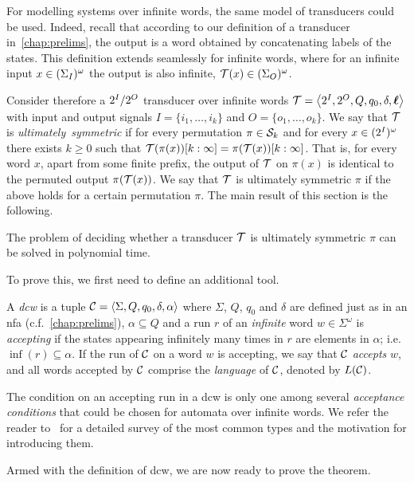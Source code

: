 For modelling systems over infinite words, the same model of transducers could be used. Indeed, recall that according to our definition of a transducer in~\cref{chap:prelims}, the output is a word obtained by concatenating labels of the states. This definition extends seamlessly for infinite words, where for an infinite input $x\in(\Sigma_{I})^\omega$ the output is also infinite, $\mathcal{T}(x)\in(\Sigma_{O})^\omega$.

Consider therefore a $2^{I}/2^{O}$ transducer over infinite words $\mathcal{T}=\left< 2^{I},2^{O},Q,q_0,\delta,\boldsymbol{\ell}\right>$ with input and output signals $I=\{i_1,\ldots,i_k\}$ and $O=\{o_1,\ldots,o_k\}$. We say that $\mathcal{T}$ is \emph{ultimately~symmetric} if for every permutation $\pi\in \mathcal{S}_k$ and for every $x\in (2^{I})^\omega$ there exists $k\ge 0$ such that $\mathcal{T}(\pi(x))[k:\infty] = \pi(\mathcal{T}(x))[k:\infty]$. That is, for every word $x$, apart from some finite prefix, the output of $\mathcal{T}$ on $\pi(x)$ is identical to the permuted output $\pi(\mathcal{T}(x))$. We say that $\mathcal{T}$ is ultimately symmetric \WRT $\pi$ if the above holds for a certain permutation $\pi$. The main result of this section is the following.

\begin{theorem}
    \label{thm:ultimate}
	The problem of deciding whether a transducer $\mathcal{T}$ is ultimately symmetric \WRT $\pi$ can be solved in polynomial time.
\end{theorem}
To prove this, we first need to define an additional tool.

A \emph{\gls{dcw}} is a tuple $\mathcal{C}=\left< \Sigma,Q,q_0,\delta,\alpha\right>$
where $\Sigma$, $Q$, $q_0$ and $\delta$ are defined just as in an \gls{nfa} (c.f.~\cref{chap:prelims}), $\alpha \subseteq Q$ and a run $r$ of an \emph{infinite} word $w\in\Sigma^\omega$ is \emph{accepting} if the states appearing infinitely many times in $r$ are elements in $\alpha$; i.e. $\inf(r) \subseteq \alpha$. If the run of $\mathcal{C}$ on a word $w$ is accepting, we say that $\mathcal{C}$ \emph{accepts} $w$, and all words accepted by $\mathcal{C}$ comprise the \emph{language} of $\mathcal{C}$, denoted by $L(\mathcal{C})$.

The condition on an accepting run in a \gls{dcw} is only one among several \emph{acceptance conditions} that could be chosen for automata over infinite words. We refer the reader to~\cite{Boker2018} for a detailed survey of the most common types and the motivation for introducing them.

Armed with the definition of \gls{dcw}, we are now ready to prove the theorem.

